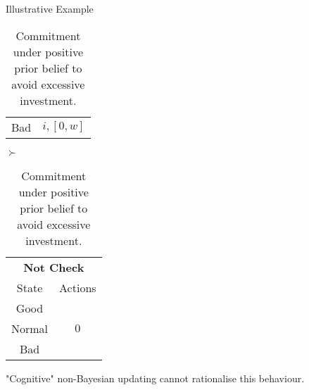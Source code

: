\documentclass[usenames,dvipsnames,aspectratio=169,11pt, envcountsect]{beamer}
\begin{document}
\begin{frame}{Illustrative Example}
\begin{table}[H]
\begin{minipage}{0.29\textwidth}
\begin{tabular}{c | c}
				Bad                          & \(  i, \left[0, w \right] \)                                                   \\
			\end{tabular}
			\vspace{0.5cm} %
		\end{minipage}\hspace{0.3cm} %
		\( \succ \) %
		\begin{minipage}{0.29\textwidth}
			\centering
			\begin{tabular}{c | c}
				\multicolumn{2}{c}{\textbf{Not Check}} \\
				State  & Actions                       \\
				\hline
				Good   & \multirow{3}{*}{ \( 0 \)}     \\
				Normal &                               \\
				Bad    &                               \\
			\end{tabular}
			\vspace{0.5cm} %
		\end{minipage}
		\caption{Commitment under positive prior belief to avoid excessive investment.} %
		\label{tab:commitment}
	\end{table}

	\vfill

	"Cognitive" non-Bayesian updating \citep{epsteinAxiomaticModelNonBayesian2006} cannot rationalise this behaviour.

\end{frame}
\end{document}
